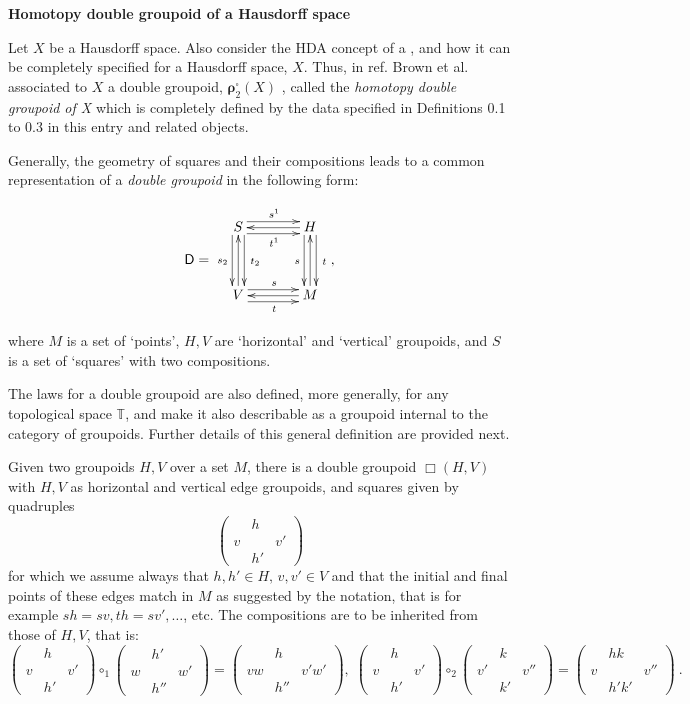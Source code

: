 \documentclass[12pt]{article}
\theoremstyle{plain}
\theoremstyle{definition}
\numberwithin{equation}{section}
\newcommand{\D}{\mathcal D}
\newcommand{\<}{{\langle}}
\newcommand{\quadr}[4]
{\begin{pmatrix} & #1& \\[-1.1ex] #2 & & #3\\[-1.1ex]& #4&
 \end{pmatrix}}
\def\D{\mathsf{D}}
\begin{document}
\textbf{Homotopy double groupoid of a Hausdorff space}

 Let $X$ be a Hausdorff space. Also consider the HDA concept of a
, 
and how it can be completely specified for a Hausdorff space, $X$. Thus, in 
ref. \cite{BHKP} Brown et al. associated to $X$ a double groupoid, $\boldsymbol{\rho}^{\square}_2 (X)$
, called the {\em homotopy double groupoid of X} which is completely defined by the data specified in Definitions 0.1 to 0.3 in this entry and related objects.

Generally, the geometry of squares and their compositions leads to a common representation of a \emph{double groupoid} in the following form:


\begin{equation}
\label{squ} \D = \vcenter{\xymatrix @=3pc {S \ar @<1ex> [r] ^{s^1} \ar @<-1ex> [r]
_{t^1} \ar @<1ex> [d]^{\, t_2}  \ar @<-1ex> [d]_{s_2} & H   \ar[l]
\ar @<1ex> [d]^{\,t}
 \ar @<-1ex> [d]_s \\
V \ar [u]  \ar @<1ex> [r] ^s \ar @<-1ex> [r] _t & M \ar [l] \ar[u]}},
\end{equation}


where $M$ is a set of `points', $H,V$ are `horizontal' and `vertical' groupoids, and $S$ is a set of
`squares' with two compositions. 

The laws for a double groupoid are also defined, more generally, for any topological space $\mathbb{T}$, and make it also describable as a groupoid internal to the category of groupoids. Further details of this general definition are provided next.

 Given two groupoids $H,V$  over a set $M$, there is a double groupoid $\Box(H,V)$ with $H,V$ as
 horizontal and vertical edge groupoids, and squares given by
 quadruples
 \bigbreak
\begin{equation}
\begin{pmatrix} & h& \\[-0.9ex] v & & v'\\[-0.9ex]& h'&
\end{pmatrix}
\end{equation}
for which we assume always that $h,h' \in H, \, v,v' \in V$ and
that the initial and final points of these edges match in $M$ as
suggested by the notation, that is for example $sh=sv, th=sv',
\ldots$, etc. The compositions are to be inherited from those of
$H,V$,
 that is:
 \bigbreak
\begin{equation}
\quadr{h}{v}{v'}{h'} \circ_1\quadr{h'}{w}{w'}{h''}
=\quadr{h}{vw}{v'w'}{h''}, \;\quadr{h}{v}{v'}{h'}
\circ_2\quadr{k}{v'}{v''}{k'}=\quadr{hk}{v}{v''}{h'k'} ~.
\end{equation}
\end{document}
